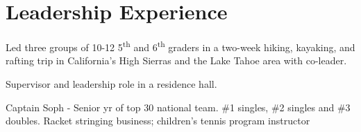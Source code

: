 \documentclass[]{deedy-resume}
\begin{document}
\begin{minipage}[t]{0.66\textwidth}
\section{Leadership Experience}





Led three groups of 10-12 5\textsuperscript{th} and 6\textsuperscript{th} graders in a two-week hiking, kayaking, and rafting trip in California's High Sierras and the Lake Tahoe area with co-leader.
\sectionspace

Supervisor and leadership role in a residence hall. 
\sectionspace

Captain Soph - Senior yr of top 30 national team. \#1 singles, \#2 singles and \#3 doubles. Racket stringing business; children’s tennis program instructor
\sectionspace


\end{minipage}
\end{document}
